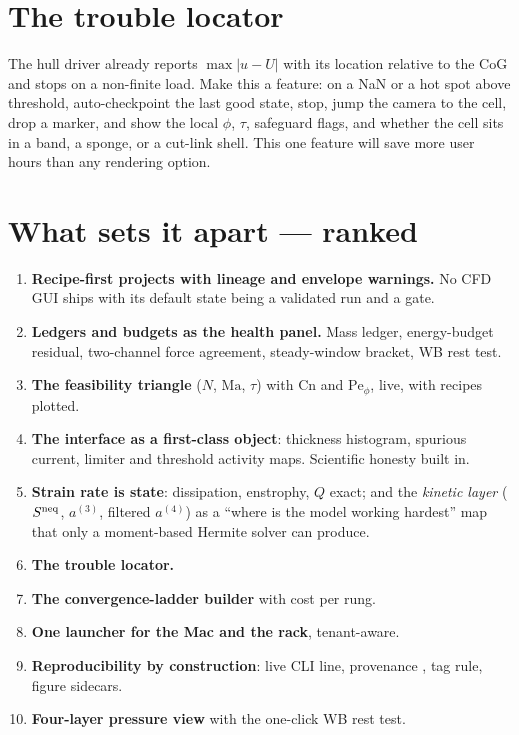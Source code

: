\documentclass[11pt,a4paper]{article}
\newcommand{\Ma}{\mathrm{Ma}}
\newcommand{\Pe}{\mathrm{Pe}}
\newcommand{\Cn}{\mathrm{Cn}}
\begin{document}
\section{The trouble locator}\label{sec:locator}
The hull driver already reports $\max|u-U|$ with its location relative to the CoG
and stops on a non-finite load. Make this a feature: on a NaN or a hot spot above
threshold, auto-checkpoint the last good state, stop, jump the camera to the cell,
drop a marker, and show the local $\phi$, $\tau$, safeguard flags, and whether the
cell sits in a band, a sponge, or a cut-link shell. This one feature will save more
user hours than any rendering option.

\section{What sets it apart --- ranked}\label{sec:diff}
\begin{enumerate}
\item \textbf{Recipe-first projects with lineage and envelope warnings.} No CFD GUI
  ships with its default state being a validated run and a gate.
\item \textbf{Ledgers and budgets as the health panel.} Mass ledger, energy-budget
  residual, two-channel force agreement, steady-window bracket, WB rest test.
\item \textbf{The feasibility triangle} ($N$, $\Ma$, $\tau$) with $\Cn$ and
  $\Pe_\phi$, live, with recipes plotted.
\item \textbf{The interface as a first-class object}: thickness histogram, spurious
  current, limiter and threshold activity maps. Scientific honesty built in.
\item \textbf{Strain rate is state}: dissipation, enstrophy, $Q$ exact; and the
  \emph{kinetic layer} ($S^{\rm neq}$, $a^{(3)}$, filtered $a^{(4)}$) as a
  ``where is the model working hardest'' map that only a moment-based Hermite solver
  can produce.
\item \textbf{The trouble locator.}
\item \textbf{The convergence-ladder builder} with cost per rung.
\item \textbf{One launcher for the Mac and the rack}, tenant-aware.
\item \textbf{Reproducibility by construction}: live CLI line, provenance
  ,  tag rule, figure sidecars.
\item \textbf{Four-layer pressure view} with the one-click WB rest test.
\end{enumerate}
\end{document}
